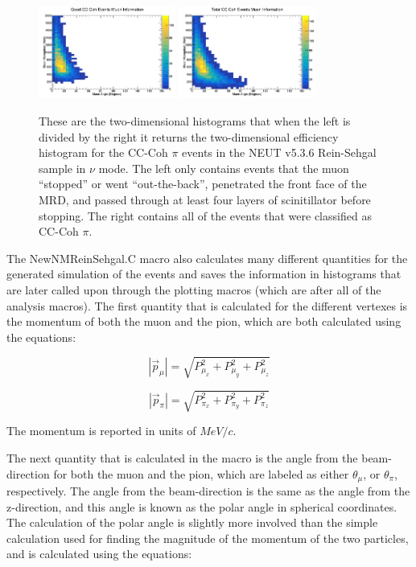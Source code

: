 \documentclass[11pt]{article}
\begin{document}
\begin{figure}[H]
\centering
\includegraphics[width=0.4\textwidth]{NewNMReinSehgalImages/7.png}
\includegraphics[width=0.4\textwidth]{NewNMReinSehgalImages/8.png}
\caption{These are the two-dimensional histograms that when the left is divided by the right it returns the two-dimensional efficiency histogram for the CC-Coh $\pi$ events in the NEUT v5.3.6 Rein-Sehgal sample in $\nu$ mode. The left only contains events that the muon ``stopped'' or went ``out-the-back'', penetrated the front face of the MRD, and passed through at least four layers of scinitillator before stopping. The right contains all of the events that were classified as CC-Coh $\pi$.}
\label{fig:app:NMCCCohMuon2DRS}
\end{figure}

The NewNMReinSehgal.C macro also calculates many different quantities for the generated simulation of the events and saves the information in histograms that are later called upon through the plotting macros (which are after all of the analysis macros). The first quantity that is calculated for the different vertexes is the momentum of both the muon and the pion, which are both calculated using the equations:

\begin{equation}
|\vec{p}_\mu| = \sqrt{P_{\mu_x}^2 + P_{\mu_y}^2 + P_{\mu_z}^2}
\end{equation}

\begin{equation}
|\vec{p}_\pi| = \sqrt{P_{\pi_x}^2 + P_{\pi_y}^2 + P_{\pi_z}^2}
\end{equation}

\noindent
The momentum is reported in units of $MeV/c$.

The next quantity that is calculated in the macro is the angle from the beam-direction for both the muon and the pion, which are labeled as either $\theta_\mu$, or $\theta_\pi$, respectively. The angle from the beam-direction is the same as the angle from the z-direction, and this angle is known as the polar angle in spherical coordinates. The calculation of the polar angle is slightly more involved than the simple calculation used for finding the magnitude of the momentum of the two particles, and is calculated using the equations:
\end{document}
